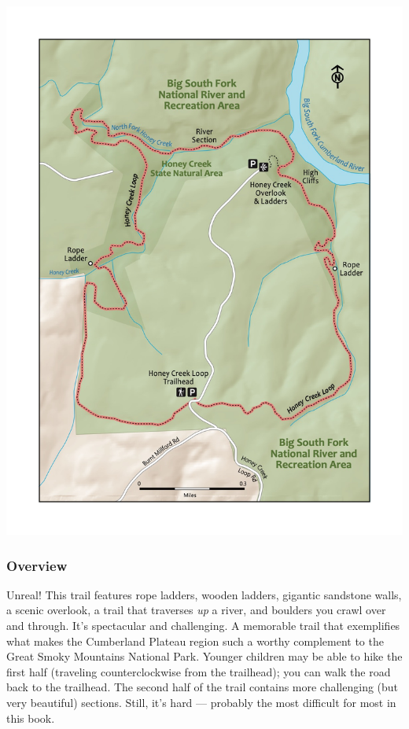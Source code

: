 \documentclass[
  letterpaper,
  DIV=11,
  numbers=noendperiod]{scrartcl}
\begin{document}
\includegraphics{maps/trail-19-map.jpeg}

\hypertarget{overview-18}{%
\subsubsection{Overview}\label{overview-18}}

Unreal! This trail features rope ladders, wooden ladders, gigantic
sandstone walls, a scenic overlook, a trail that traverses \emph{up} a
river, and boulders you crawl over and through. It's spectacular and
challenging. A memorable trail that exemplifies what makes the
Cumberland Plateau region such a worthy complement to the Great Smoky
Mountains National Park. Younger children may be able to hike the first
half (traveling counterclockwise from the trailhead); you can walk the
road back to the trailhead. The second half of the trail contains more
challenging (but very beautiful) sections. Still, it's hard --- probably
the most difficult for most in this book.
\end{document}
